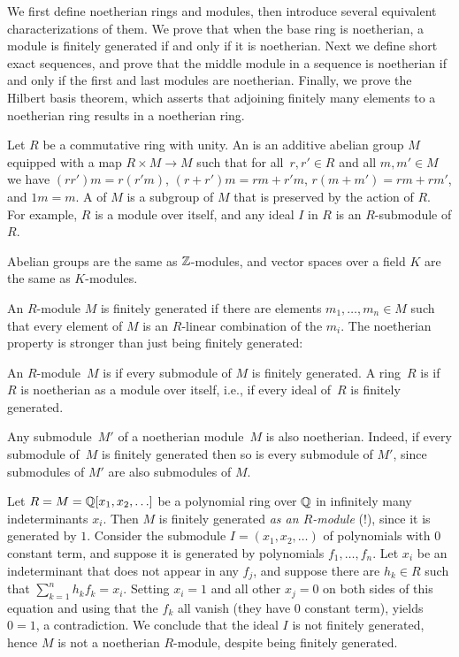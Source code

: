 We first define noetherian rings and modules, then introduce several
equivalent characterizations of them.  We prove that when the
base ring is noetherian, a module is finitely generated if and only if
it is noetherian.  Next we define short exact sequences, and prove
that the middle module in a sequence is noetherian if and only if the
first and last modules are noetherian.  Finally, we prove the Hilbert
basis theorem, which asserts that adjoining finitely many elements
to a noetherian ring results in a noetherian ring.

Let $R$ be a commutative ring with unity.
An  is an additive abelian
group $M$ equipped with a map $R\times M \to M$ such that for all~$r,
r'\in R$ and all $m, m'\in M$ we have $(r r')m = r(r' m )$, $(r + r')m
= rm + r' m$, $r(m+m') = rm + rm'$, and $1m=m$.  A  of $M$
is a subgroup of $M$ that is preserved by the action of $R$.
For example, $R$ is a module over itself, and
any ideal $I$ in $R$ is an $R$-submodule of $R$.

\begin{example}
	Abelian groups are the same as $\mathbb{Z}$-modules, and vector spaces
	over a field $K$ are the same as $K$-modules.
\end{example}

An $R$-module $M$ is finitely generated if there are elements $m_1, \ldots, m_n\in M$
such that every element of $M$ is an $R$-linear combination of the $m_i$.  The noetherian
property is stronger than just being finitely generated:

\begin{definition}[Noetherian]
	An $R$-module~$M$ is  if every
	submodule of $M$ is finitely generated.  A ring~$R$ is
	 if~$R$ is noetherian as a module over itself,
	i.e., if every ideal of~$R$ is finitely generated.
\end{definition}

Any submodule~$M'$ of a noetherian module~$M$ is also noetherian.
Indeed, if every submodule of~$M$ is finitely generated then so is
every submodule of $M'$, since submodules of $M'$ are also submodules
of $M$.

\begin{example}
	Let $R=M=\mathbb{Q}[x_1,x_2,\ldots]$ be a polynomial ring over $\mathbb{Q}$ in
	infinitely many indeterminants $x_i$.  Then $M$ is finitely generated
	{\em as an $R$-module} (!), since it is generated by $1$.  Consider
	the submodule $I=(x_1,x_2,\ldots)$ of polynomials with $0$ constant
	term, and suppose it is generated by polynomials $f_1, \ldots, f_n$.
	Let $x_i$ be an indeterminant that does not appear in any $f_j$, and
	suppose there are $h_k\in R$ such that $\sum_{k=1}^n h_k f_k = x_i$.
	Setting $x_i=1$ and all other $x_j=0$ on both sides of this equation
	and using that the $f_k$ all vanish (they have 0 constant term),
	yields $0=1$, a contradiction.  We conclude that the ideal $I$ is not
	finitely generated, hence $M$ is not a noetherian $R$-module, despite
	being finitely generated.
\end{example}

